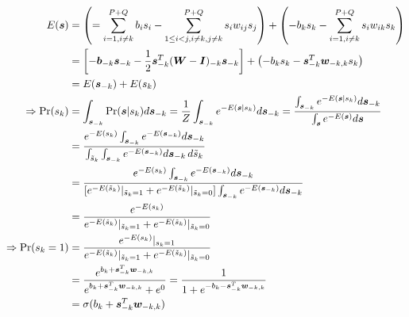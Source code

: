 \documentclass[11pt]{article}
\newcommand{\bs}{\boldsymbol}
\newcommand{\vb}{\boldsymbol{b}}
\newcommand{\vw}{\boldsymbol{w}}
\newcommand{\vs}{\boldsymbol{s}}
\newcommand{\mw}{\boldsymbol{W}}
\begin{document}
\begin{align*}
  E(\vs)
  & = \left( =\sum_{i=1, i \ne k}^{P+Q} b_i s_i - \sum_{1 \le i < j, i \ne k, j \ne k}^{P+Q} s_i w_{ij} s_j \right) + \left(-b_k s_k - \sum_{i=1, i \ne k}^{P+Q}s_i w_{ik} s_k \right) \\
  & = \left[ -\vb_{-k}\vs_{-k} -\frac{1}{2}\vs_{-k}^T(\mw - \bs{I})_{-k}\vs_{-k} \right] + \left( -b_k s_k - \vs_{-k}^T \vw_{-k, k} s_k \right) \\
  & = E(\vs_{-k}) + E(s_k) \\
  \Rightarrow \Pr(s_k)
  & = \int_{\vs_{-k}} \Pr(\vs | s_k) d\vs_{-k}
    = \frac{1}{Z} \int_{\vs_{-k}} e^{-E(\vs|s_k)} d\vs_{-k} 
    = \frac{\int_{\vs_{-k}} e^{-E(\vs|s_k)} d\vs_{-k}}{\int_{\vs} e^{-E(\vs)} d\vs} \\
  & = \frac{e^{-E(s_k)} \int_{\vs_{-k}} e^{-E(\vs_{-k})} d\vs_{-k}}  {\int_{\st_k} \int_{\vs_{-k}} e^{-E(\vs_{-k})} d\vs_{-k}\,d\st_k} \\
  & = \frac{e^{-E(s_k)} \int_{\vs_{-k}} e^{-E(\vs_{-k})} d\vs_{-k}}  {[e^{-E(\st_k)}|_{\st_k=1} + e^{-E(\st_k)}|_{\st_k=0}] \int_{\vs_{-k}} e^{-E(\vs_{-k})} d\vs_{-k}} \\
  & = \frac{e^{-E(s_k)}}{e^{-E(\st_k)}|_{\st_k=1} + e^{-E(\st_k)}|_{\st_k=0}} \\
  \Rightarrow \Pr(s_k=1)
  & = \frac{e^{-E(s_k)}|_{s_k=1}}{e^{-E(\st_k)}|_{\st_k=1} + e^{-E(\st_k)}|_{\st_k=0}} \\
  & = \frac{e^{b_k + \vs_{-k}^T \vw_{-k, k}}}{e^{b_k + \vs_{-k}^T \vw_{-k, k}} + e^{0}}
    = \frac{1}{1 + e^{-b_k - \vs_{-k}^T \vw_{-k, k}}} \\
  & = \sigma(b_k + \vs_{-k}^T \vw_{-k, k})
\end{align*}
\end{document}

